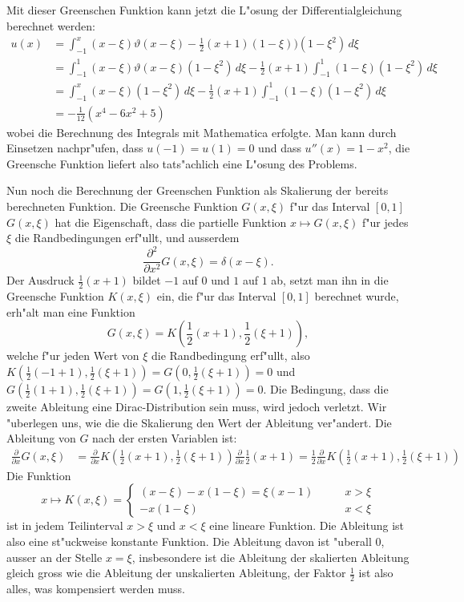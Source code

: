 \begin{loesung}
Mit dieser Greenschen Funktion kann jetzt die L"osung der
Differentialgleichung berechnet werden:
\begin{align*}
u(x)&=\int_{-1}^x
(x-\xi)\vartheta(x-\xi)-{\textstyle\frac12}(x+1)(1-\xi)
)(1-\xi^2)\,d\xi
\\
&=
\int_{-1}^1(x-\xi)\vartheta(x-\xi)(1-\xi^2)\,d\xi
-{\textstyle\frac12}(x+1)\int_{-1}^1(1-\xi)(1-\xi^2)\,d\xi
\\
&=
\int_{-1}^x(x-\xi)(1-\xi^2)\,d\xi
-{\textstyle\frac12}(x+1)\int_{-1}^1(1-\xi)(1-\xi^2)\,d\xi
\\
&=
-\frac1{12}(x^4-6x^2+5)
\end{align*}
wobei die Berechnung des Integrals mit Mathematica erfolgte.
Man kann durch Einsetzen nachpr"ufen, dass
$u(-1)=u(1)=0$ und dass $u''(x)=1-x^2$, die Greensche Funktion
liefert also tats"achlich eine L"osung des Problems.

Nun noch die Berechnung der Greenschen Funktion als Skalierung
der bereits berechneten Funktion. Die Greensche Funktion $G(x,\xi)$ f"ur
das Interval $[0,1]$
$G(x,\xi)$ hat die Eigenschaft, dass die partielle Funktion
$x\mapsto G(x,\xi)$ f"ur jedes $\xi$ die Randbedingungen erf"ullt,
und ausserdem
\[
\frac{\partial^2}{\partial x^2}G(x,\xi)=\delta(x-\xi).
\]
Der Ausdruck $\frac12(x+1)$ bildet $-1$ auf $0$ und $1$ auf $1$
ab, setzt man ihn in die Greensche Funktion $K(x,\xi)$ ein,
die f"ur das Interval $[0,1]$ berechnet wurde,
erh"alt man eine Funktion
\[
G(x,\xi)=K({\textstyle\frac12}(x+1),{\textstyle\frac12}(\xi+1)),
\]
welche
f"ur jeden Wert von $\xi$ die Randbedingung erf"ullt, also
$K(\frac12(-1+1),\frac12(\xi+1))=G(0,\frac12(\xi+1))=0$ und
$G(\frac12(1+1),\frac12(\xi+1))=G(1,\frac12(\xi+1))=0$.
Die Bedingung, dass die zweite Ableitung eine Dirac-Distribution
sein muss, wird jedoch verletzt. Wir "uberlegen uns, wie die
die Skalierung den Wert der Ableitung ver"andert.
Die Ableitung von $G$ nach der ersten Variablen ist:
\begin{align*}
\frac{\partial}{\partial x}G(x,\xi)
&=
\frac{\partial}{\partial x}K({\textstyle\frac12}(x+1),{\textstyle\frac12}(\xi+1))\frac{\partial}{\partial x}\frac12(x+1)
=
\frac12\frac{\partial }{\partial x}K({\textstyle \frac12}(x+1), {\textstyle\frac12}(\xi+1))
\end{align*}
Die Funktion
\[
x\mapsto K(x,\xi)=\begin{cases}
(x-\xi)-x(1-\xi)=\xi(x-1)&\qquad x>\xi
\\
-x(1-\xi)&\qquad x<\xi
\end{cases}
\]
ist in jedem Teilinterval $x>\xi$ und $x<\xi$ eine lineare Funktion. Die Ableitung
ist also eine st"uckweise konstante Funktion.
Die Ableitung davon ist "uberall $0$, ausser an der Stelle $x=\xi$,
insbesondere ist die Ableitung der skalierten Ableitung gleich gross
wie die Ableitung der unskalierten Ableitung, der Faktor $\frac12$ ist
also alles, was kompensiert werden muss.


\end{loesung}
